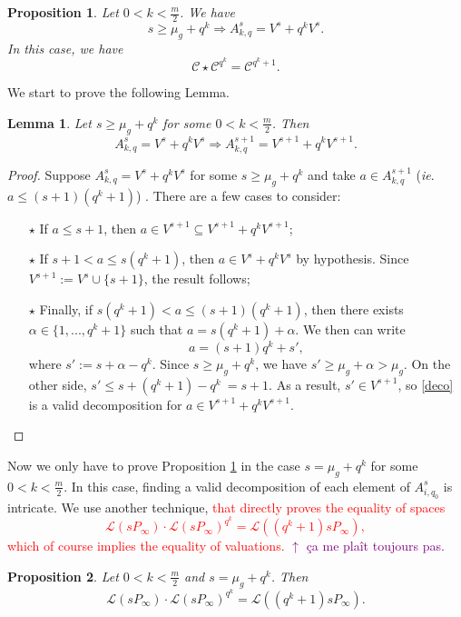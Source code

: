 \documentclass[a4paper]{article}
\newtheorem{prop1}{Proposition}
\newtheorem{lem1}{Lemma}
\newcommand{\calL}{\mathcal{L}}
\newcommand{\calC}{\mathcal{C}}
\newcommand\jade[1]{\textcolor{purple}{#1}}
\begin{document}
\begin{prop1} \label{powers_of_q's_case}
Let $0 < k < \frac{m}{2}$. We have
\[ s \geq \mu_g+q^k \Rightarrow A^s_{k,q} = V^s+q^kV^s.\]
In this case, we have 
 \[ \calC \star \calC^{q^k} = \calC^{q^k+1}.\]
\end{prop1}

We start to prove the following Lemma.

\begin{lem1} \label{technical_lemma}
Let $s \geq \mu_g+q^k$ for some $0 < k < \frac{m}{2}$. Then 
\[A^s_{k,q} = V^s+q^kV^s \Rightarrow A^{s+1}_{k,q} = V^{s+1}+q^kV^{s+1}.\]
\end{lem1}

\begin{proof}
Suppose $A^s_{k,q} = V^s+q^kV^s$ for some $s \geq \mu_g+q^k$ and take $a \in A^{s+1}_{k,q}$ (\emph{ie}. $a \leq (s+1)(q^k+1)$) . There are a few cases to consider:
\begin{itemize}
    \item[$\star$] If $a \leq s+1$, then $a \in V^{s+1} \subseteq V^{s+1}+q^kV^{s+1}$;
    \item[$\star$] If $s+1 < a \leq s(q^k+1)$, then $a \in V^s+q^kV^s$ by hypothesis. Since $V^{s+1} := V^s \cup \{s+1\}$, the result follows;
    \item[$\star$] Finally, if $s(q^k+1) < a \leq (s+1)(q^k+1)$, then there exists $\alpha \in \{1,...,q^k+1\}$ such that $a=s(q^k+1)+\alpha$. We then can write 
    \begin{equation} \label{deco}
        a = (s+1)q^k + s',
    \end{equation}
    where $s':=s+\alpha-q^k$. Since $s \geq \mu_g+q^k$, we have $s' \geq \mu_g+\alpha > \mu_g$. On the other side, $s' \leq s+(q^k+1)-q^k~=s+1$. As a result, $s' \in V^{s+1}$, so \eqref{deco} is a valid decomposition for $a \in V^{s+1}+q^kV^{s+1}$.
\end{itemize}
\end{proof}

Now we only have to prove Proposition \ref{powers_of_q's_case} in the case $s=\mu_g+q^k$ for some $0 < k < \frac{m}{2}$. In this case, finding a valid decomposition of each element of $A^s_{i,q_0}$ is intricate. We use another technique, \textcolor{red}{that directly proves the equality of spaces 
\[\calL(sP_{\infty}) \cdot \calL(sP_{\infty})^{q^k} =\calL((q^k+1)sP_{\infty}),\]
which of course implies the equality of valuations.}
\jade{$\uparrow$ ça me plaît toujours pas.}
\begin{prop1} \label{prop_avec_dessins}
Let $0 < k < \frac{m}{2}$ and $s=\mu_g+q^k$. Then 
\[\calL(sP_{\infty}) \cdot \calL(sP_{\infty})^{q^k} =\calL((q^k+1)sP_{\infty}).\]
\end{prop1}
\end{document}
